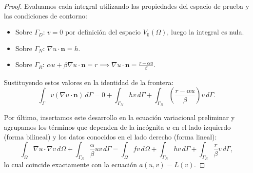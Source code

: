 \documentclass[11pt]{book}
\theoremstyle{plain} %
\theoremstyle{definition} %
\theoremstyle{definition} %
\begin{document}
\begin{proof}
    Evaluamos cada integral utilizando las propiedades del espacio de prueba y las condiciones de contorno:
    \begin{itemize}
        \item Sobre $\Gamma_D$: $v = 0$ por definición del espacio $V_0(\Omega)$, luego la integral es nula.
        \item Sobre $\Gamma_N$: $\nabla u \cdot \mathbf{n} = h$.
        \item Sobre $\Gamma_R$: $\alpha u + \beta \nabla u \cdot \mathbf{n} = r \implies \nabla u \cdot \mathbf{n} = \frac{r - \alpha u}{\beta}$.
    \end{itemize}

    Sustituyendo estos valores en la identidad de la frontera:
    \begin{equation*}
        \int_{\Gamma} v (\nabla u \cdot \mathbf{n}) \, d\Gamma = 0 + \int_{\Gamma_N} h v \, d\Gamma + \int_{\Gamma_R} \left(\frac{r - \alpha u}{\beta}\right) v \, d\Gamma.
    \end{equation*}

    Por último, insertamos este desarrollo en la ecuación variacional preliminar y agrupamos los términos que dependen de la incógnita $u$ en el lado izquierdo (forma bilineal) y los datos conocidos en el lado derecho (forma lineal):
    \begin{equation*}
        \int_{\Omega} \nabla u \cdot \nabla v \, d\Omega + \int_{\Gamma_R} \frac{\alpha}{\beta} u v \, d\Gamma = \int_{\Omega} f v \, d\Omega + \int_{\Gamma_N} h v \, d\Gamma + \int_{\Gamma_R} \frac{r}{\beta} v \, d\Gamma,
    \end{equation*}
    lo cual coincide exactamente con la ecuación $a(u,v) = L(v)$.
\end{proof}
\end{document}
